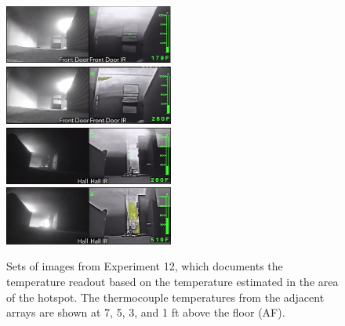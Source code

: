 \documentclass[12pt,oneside]{book}
\begin{document}
\begin{figure}[H]
\centering
\includegraphics[width=0.495\textwidth]{../0_Images/Tactical_Considerations/Thermal_Imager/Exp12FD_10min.png}
\includegraphics[width=0.495\textwidth]{../0_Images/Tactical_Considerations/Thermal_Imager/Exp12FD_11_7min.png}
\includegraphics[width=0.495\textwidth]{../0_Images/Tactical_Considerations/Thermal_Imager/Exp12Hall_10min.png}
\includegraphics[width=0.495\textwidth]{../0_Images/Tactical_Considerations/Thermal_Imager/Exp12Hall_11_7min.png}
\caption[Thermal Imager H]{Sets of images from Experiment 12, which documents the temperature readout based on the temperature estimated in the area of the hotspot. The thermocouple temperatures from the adjacent arrays are shown at 7, 5, 3, and 1 ft above the floor (AF).}
\label{fig:thermal_imager_h}
\end{figure}
\end{document}
